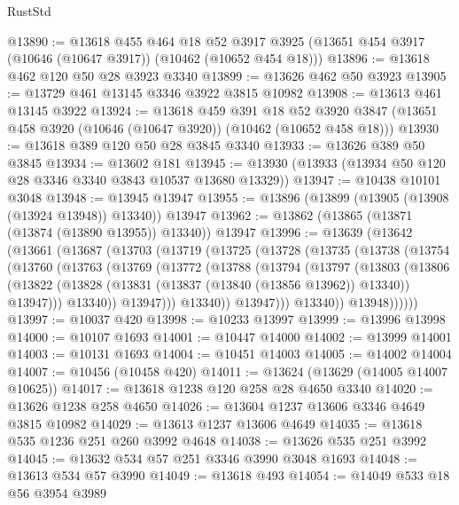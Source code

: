 \begin{lexlean}{RustStd}
\begin{coremodule}
@13890 := @13618
    @455
    @464
    @18
    @52
    @3917
    @3925
    (@13651 @454 @3917 (@10646 (@10647 @3917)) (@10462 (@10652 @454 @18)))
@13896 := @13618 @462 @120 @50 @28 @3923 @3340
@13899 := @13626 @462 @50 @3923
@13905 := @13729 @461 @13145 @3346 @3922 @3815 @10982
@13908 := @13613 @461 @13145 @3922
@13924 := @13618
    @459
    @391
    @18
    @52
    @3920
    @3847
    (@13651 @458 @3920 (@10646 (@10647 @3920)) (@10462 (@10652 @458 @18)))
@13930 := @13618 @389 @120 @50 @28 @3845 @3340
@13933 := @13626 @389 @50 @3845
@13934 := @13602 @181
@13945 := @13930 (@13933 (@13934 @50 @120 @28 @3346 @3340 @3843 @10537 @13680 @13329))
@13947 := @10438 @10101 @3048
@13948 := @13945 @13947
@13955 := @13896 (@13899 (@13905 (@13908 (@13924 @13948)) @13340)) @13947
@13962 := @13862 (@13865 (@13871 (@13874 (@13890 @13955)) @13340)) @13947
@13996 := @13639
    (@13642
      (@13661
        (@13687
          (@13703
            (@13719
              (@13725
                (@13728
                  (@13735
                    (@13738
                      (@13754
                        (@13760
                          (@13763
                            (@13769
                              (@13772
                                (@13788
                                  (@13794
                                    (@13797
                                      (@13803
                                        (@13806
                                          (@13822
                                            (@13828
                                              (@13831 (@13837 (@13840 (@13856 @13962)) @13340))
                                              @13947)))
                                        @13340))
                                    @13947)))
                              @13340))
                          @13947)))
                    @13340))
                @13948))))))
@13997 := @10037 @420
@13998 := @10233 @13997
@13999 := @13996 @13998
@14000 := @10107 @1693
@14001 := @10447 @14000
@14002 := @13999 @14001
@14003 := @10131 @1693
@14004 := @10451 @14003
@14005 := @14002 @14004
@14007 := @10456 (@10458 @420)
@14011 := @13624 (@13629 (@14005 @14007 @10625))
@14017 := @13618 @1238 @120 @258 @28 @4650 @3340
@14020 := @13626 @1238 @258 @4650
@14026 := @13604 @1237 @13606 @3346 @4649 @3815 @10982
@14029 := @13613 @1237 @13606 @4649
@14035 := @13618 @535 @1236 @251 @260 @3992 @4648
@14038 := @13626 @535 @251 @3992
@14045 := @13632 @534 @57 @251 @3346 @3990 @3048 @1693
@14048 := @13613 @534 @57 @3990
@14049 := @13618 @493
@14054 := @14049 @533 @18 @56 @3954 @3989

\end{coremodule}
\end{lexlean}

